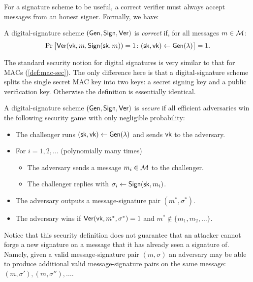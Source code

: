 For a signature scheme to be useful, a correct verifier must always accept messages from an
honest signer. Formally, we have:

\begin{definition}
  A digital-signature scheme $(\mathsf{Gen}, \mathsf{Sign}, \mathsf{Ver})$ is \emph{correct} if,
  for all messages $m \in \mathcal{M}$:
  \[ \Pr\big[\mathsf{Ver}(\mathsf{vk}, m, \mathsf{Sign}({\mathsf{sk}}, m)) = 1 \colon ({\mathsf{sk}}, \mathsf{vk}) \gets \mathsf{Gen}(\lambda) \big] = 1. \]
\end{definition}

The standard security notion for digital signatures is very similar
to that for MACs (\cref{def:mac-sec}).
The only difference here is that a digital-signature scheme splits the single
secret MAC key into two keys: a secret signing key and a public verification key.
Otherwise the definition is essentially identical.

\begin{definition}\label{def:sig-sec}
  A digital-signature scheme $(\mathsf{Gen}, \mathsf{Sign}, \mathsf{Ver})$ is \emph{secure} if
  all efficient adversaries win the following security 
  game with only negligible probability:
  \begin{itemize}[noitemsep]
    \item The challenger runs $({\mathsf{sk}}, \mathsf{vk}) \gets \mathsf{Gen}(\lambda)$ and sends $\mathsf{vk}$ to the adversary.
    \item For $i = 1, 2, \dots$  (polynomially many times)
      \begin{itemize}
        \item The adversary sends a message $m_i \in \mathcal{M}$ to the challenger.
        \item The challenger replies with $\sigma_i \gets \mathsf{Sign}({\mathsf{sk}}, m_i)$.
      \end{itemize}
    \item The adversary outputs a message-signature pair $(m^*, \sigma^*)$.
    \item The adversary wins if $\mathsf{Ver}(\mathsf{vk}, m^*, \sigma^*) = 1$ and $m^* \not \in \{m_1, m_2, \dots\}$.
  \end{itemize}
\end{definition}

Notice that this   security definition does not guarantee that an attacker cannot forge a new signature on a message that it has already seen a signature of. 
Namely, given a valid
message-signature pair $(m, \sigma)$ an adversary may be able to produce additional valid message-signature
pairs on the same message: $(m, \sigma'), (m, \sigma''), \dots$.

